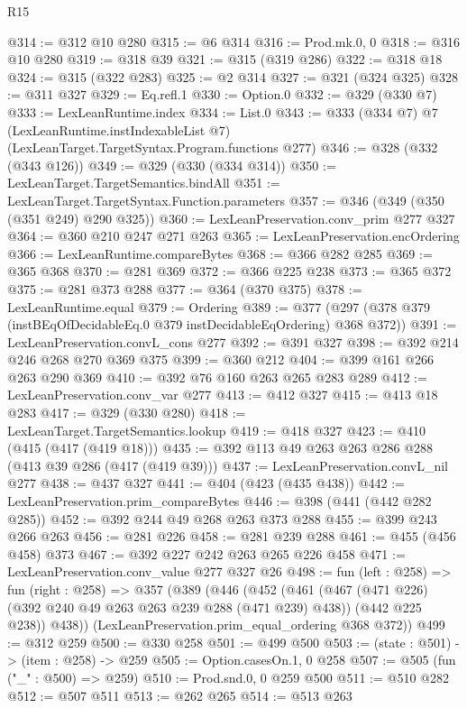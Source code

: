 \begin{lexlean}{R15}
\begin{coremodule}
@314 := @312 @10 @280
@315 := @6 @314
@316 := Prod.mk.{0, 0}
@318 := @316 @10 @280
@319 := @318 @39
@321 := @315 (@319 @286)
@322 := @318 @18
@324 := @315 (@322 @283)
@325 := @2 @314
@327 := @321 (@324 @325)
@328 := @311 @327
@329 := Eq.refl.{1}
@330 := Option.{0}
@332 := @329 (@330 @7)
@333 := LexLeanRuntime.index
@334 := List.{0}
@343 := @333
    (@334 @7)
    @7
    (LexLeanRuntime.instIndexableList @7)
    (LexLeanTarget.TargetSyntax.Program.functions @277)
@346 := @328 (@332 (@343 @126))
@349 := @329 (@330 (@334 @314))
@350 := LexLeanTarget.TargetSemantics.bindAll
@351 := LexLeanTarget.TargetSyntax.Function.parameters
@357 := @346 (@349 (@350 (@351 @249) @290 @325))
@360 := LexLeanPreservation.conv_prim @277 @327
@364 := @360 @210 @247 @271 @263
@365 := LexLeanPreservation.encOrdering
@366 := LexLeanRuntime.compareBytes
@368 := @366 @282 @285
@369 := @365 @368
@370 := @281 @369
@372 := @366 @225 @238
@373 := @365 @372
@375 := @281 @373 @288
@377 := @364 (@370 @375)
@378 := LexLeanRuntime.equal
@379 := Ordering
@389 := @377 (@297 (@378 @379 (instBEqOfDecidableEq.{0} @379 instDecidableEqOrdering) @368 @372))
@391 := LexLeanPreservation.convL_cons @277
@392 := @391 @327
@398 := @392 @214 @246 @268 @270 @369 @375
@399 := @360 @212
@404 := @399 @161 @266 @263 @290 @369
@410 := @392 @76 @160 @263 @265 @283 @289
@412 := LexLeanPreservation.conv_var @277
@413 := @412 @327
@415 := @413 @18 @283
@417 := @329 (@330 @280)
@418 := LexLeanTarget.TargetSemantics.lookup
@419 := @418 @327
@423 := @410 (@415 (@417 (@419 @18)))
@435 := @392 @113 @49 @263 @263 @286 @288 (@413 @39 @286 (@417 (@419 @39)))
@437 := LexLeanPreservation.convL_nil @277
@438 := @437 @327
@441 := @404 (@423 (@435 @438))
@442 := LexLeanPreservation.prim_compareBytes
@446 := @398 (@441 (@442 @282 @285))
@452 := @392 @244 @49 @268 @263 @373 @288
@455 := @399 @243 @266 @263
@456 := @281 @226
@458 := @281 @239 @288
@461 := @455 (@456 @458) @373
@467 := @392 @227 @242 @263 @265 @226 @458
@471 := LexLeanPreservation.conv_value @277 @327 @26
@498 := fun (left : @258) =>
  fun (right : @258) =>
  @357
    (@389
      (@446
        (@452
          (@461
            (@467 (@471 @226) (@392 @240 @49 @263 @263 @239 @288 (@471 @239) @438))
            (@442 @225 @238))
          @438))
      (LexLeanPreservation.prim_equal_ordering @368 @372))
@499 := @312 @259
@500 := @330 @258
@501 := @499 @500
@503 := (state : @501) -> (item : @258) -> @259
@505 := Option.casesOn.{1, 0} @258
@507 := @505 (fun ("_" : @500) => @259)
@510 := Prod.snd.{0, 0} @259 @500
@511 := @510 @282
@512 := @507 @511
@513 := @262 @265
@514 := @513 @263

\end{coremodule}
\end{lexlean}
